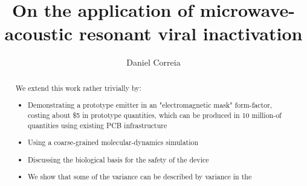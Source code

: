 \documentclass[11pt]{article}
\title{\textbf{On the application of microwave-acoustic resonant viral inactivation}}
\author{Daniel Correia}
\date{}
\begin{document}
\maketitle

\begin{abstract}
We extend this work rather trivially by:
\begin{itemize}
  \item Demonstrating a prototype emitter in an "electromagnetic mask" form-factor, costing about \$5 in prototype quantities, which can be produced in 10 million-of quantities using existing PCB infrastructure  
  \item Using a coarse-grained molecular-dynamics simulation 
  \item Discussing the biological basis for the safety of the device
  \item We show that some of the variance can be described by variance in the 
\end{itemize}
\end{abstract}
\end{document}
